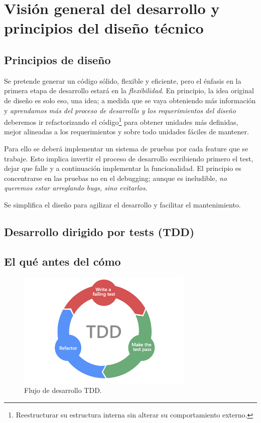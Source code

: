 
\section{Visión general del desarrollo y principios del diseño técnico}\label{principios:vision-general-desarrollo}

\subsection{Principios de diseño}\label{principios:principios-de-diseno}
Se pretende generar un código sólido, flexible y eficiente, pero el énfasis en la primera etapa de desarrollo estará en la \emph{flexibilidad}. En principio, la idea original de diseño es solo eso, una idea; a medida que se vaya obteniendo más información y \emph{aprendamos más del proceso de desarrollo y los requerimientos del diseño} deberemos ir refactorizando el código\footnote{Reestructurar su estructura interna sin alterar su comportamiento externo.} para obtener unidades más definidas, mejor alineadas a los requerimientos y sobre todo unidades fáciles de mantener.

Para ello se deberá implementar un sistema de pruebas por cada feature que se trabaje. Esto implica invertir el proceso de desarrollo escribiendo primero el test, dejar que falle y a continuación implementar la funcionalidad. El principio es concentrarse en las pruebas no en el \foreignlanguage{english}{debugging}; aunque es ineludible, \emph{no queremos estar arreglando bugs, sino evitarlos}.

Se simplifica el diseño para agilizar el desarrollo y facilitar el mantenimiento.

\subsection{Desarrollo dirigido por tests (TDD)}\label{principios:TDD}
\subsection*{El qué antes del cómo}

\begin{figure}[ht]
	\centering
	\includegraphics[width=0.75\textwidth]{images/tdd.png}
	\caption{Flujo de desarrollo TDD.}
\end{figure}


